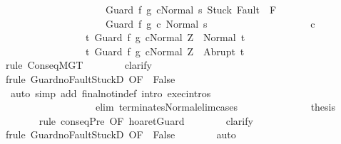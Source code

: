 \begin{isabellebody}
\ \ \ \ \ \ \ \ \ \ \ \ \ \ \ \ \ \ \ \ \ {\isasymGamma}{\isasymturnstile}{\isasymlangle}Guard\ f\ g\ c{\isacharcomma}Normal\ s{\isasymrangle}\ {\isasymRightarrow}{\isasymnotin}{\isacharparenleft}{\isacharbraceleft}Stuck{\isacharbraceright}{\isasymunion}\ Fault\ {\isacharbackquote}\ {\isacharparenleft}{\isacharminus}F{\isacharparenright}{\isacharparenright}{\isasymand}\isanewline
\ \ \ \ \ \ \ \ \ \ \ \ \ \ \ \ \ \ \ \ \ {\isasymGamma}{\isasymturnstile}Guard\ f\ g\ c{\isasymdown}\ Normal\ s{\isacharbraceright}\ {\isacharparenright}\isanewline
\ \ \ \ \ \ \ \ \ \ \ \ \ \ \ \ \ \ \ c\isanewline
\ \ \ \ \ \ \ \ \ \ \ \ \ \ \ \ \ {\isacharbraceleft}t{\isachardot}\ {\isasymGamma}{\isasymturnstile}{\isasymlangle}Guard\ f\ g\ c{\isacharcomma}Normal\ Z{\isasymrangle}\ {\isasymRightarrow}\ Normal\ t{\isacharbraceright}{\isacharcomma}\isanewline
\ \ \ \ \ \ \ \ \ \ \ \ \ \ \ \ \ {\isacharbraceleft}t{\isachardot}\ {\isasymGamma}{\isasymturnstile}{\isasymlangle}Guard\ f\ g\ c{\isacharcomma}Normal\ Z{\isasymrangle}\ {\isasymRightarrow}\ Abrupt\ t{\isacharbraceright}{\isachardoublequoteclose}\isanewline
\ \ \ \ \ \ \isamarkupfalse%
\ {\isacharparenleft}rule\ ConseqMGT{\isacharparenright}\isanewline
\ \ \ \ \ \ \isamarkupfalse%
\ clarify\isanewline
\ \ \ \ \ \ \isamarkupfalse%
\ {\isacharparenleft}frule\ Guard{\isacharunderscore}noFaultStuckD\ {\isacharbrackleft}OF\ {\isacharunderscore}\ False{\isacharbrackright}{\isacharparenright}\isanewline
\ \ \ \ \ \ \isamarkupfalse%
\ \ {\isacharparenleft}auto\ simp\ add{\isacharcolon}\ final{\isacharunderscore}notin{\isacharunderscore}def\ intro{\isacharcolon}\ exec{\isachardot}intros\ \isanewline
\ \ \ \ \ \ \ \ \ \ \ \ \ \ \ \ \ \ \ elim{\isacharcolon}\ terminates{\isacharunderscore}Normal{\isacharunderscore}elim{\isacharunderscore}cases{\isacharparenright}\isanewline
\ \ \ \ \ \ \isamarkupfalse%
\isanewline
\ \ \ \ \isamarkupfalse%
\ \isamarkupfalse%
\ {\isacharquery}thesis\isanewline
\ \ \ \ \ \ \isamarkupfalse%
\ {\isacharparenleft}rule\ conseqPre\ {\isacharbrackleft}OF\ hoaret{\isachardot}Guard{\isacharbrackright}{\isacharparenright}\isanewline
\ \ \ \ \ \ \isamarkupfalse%
\ clarify\isanewline
\ \ \ \ \ \ \isamarkupfalse%
\ {\isacharparenleft}frule\ Guard{\isacharunderscore}noFaultStuckD\ {\isacharbrackleft}OF\ {\isacharunderscore}\ False{\isacharbrackright}{\isacharparenright}\isanewline
\ \ \ \ \ \ \isamarkupfalse%
\ auto\isanewline

\end{isabellebody}
